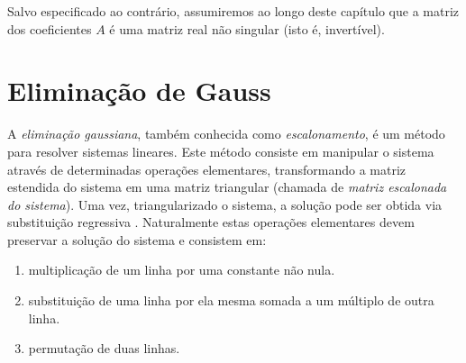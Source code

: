 \documentclass[
	12pt,				%
	oneside,			%
	a4paper,			%
	english,			%
	french,				%
	spanish,			%
	brazil				%
	]{abntex2}
\begin{document}
Salvo especificado ao contrário, assumiremos ao longo deste capítulo que a matriz dos coeficientes $A$ é uma matriz real não singular (isto é, invertível).

\section{Eliminação de Gauss}
A \emph{eliminação gaussiana}, também conhecida como \emph{escalonamento}, é um método para resolver sistemas lineares. Este método consiste em manipular o sistema através de determinadas operações elementares, transformando a matriz estendida do sistema em uma matriz triangular (chamada de \emph{matriz escalonada do sistema})\cite{ufpb}. Uma vez, triangularizado o sistema, a solução pode ser obtida via substituição regressiva \cite{neide}. Naturalmente estas operações elementares devem preservar a solução do sistema e consistem em:
\begin{enumerate}
\item multiplicação de um linha por uma constante não nula.
\item substituição de uma linha por ela mesma somada a um múltiplo de outra linha.
\item permutação de duas linhas.
\end{enumerate}
\end{document}
